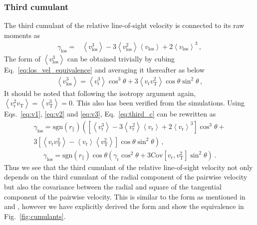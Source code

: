 \documentclass[a4paper,fleqn,usenatbib]{mnras}
\begin{document}
	\subsubsection{Third cumulant}
	\noindent The third cumulant of the relative line-of-sight velocity is connected to its raw moments as
	\begin{eqnarray}\label{eq:third_c}
		\gamma_{\mathrm{los}} = & \left\langle v^3_{\mathrm{los}} \right\rangle - 3 \left\langle v^2_{\mathrm{los}} \right\rangle \left\langle v_{\mathrm{los}}\right\rangle  + 2 \left\langle v_{\mathrm{los}}\right\rangle^3 \, ,
	\end{eqnarray}
	The form of $\left\langle v^3_{\mathrm{los}} \right\rangle$ can be obtained trivially by cubing Eq.~\ref{eq:los_vel_equivalence} and averaging it thereafter as below
	\begin{eqnarray}\label{eq:v3}
	\left\langle v^3_{\mathrm{los}} \right\rangle = \left\langle v^3_{\mathrm{r}}\right\rangle \cos^3\theta + 3 \left\langle  v_{\mathrm{r}}v^2_{\mathrm{T}}\right\rangle\cos\theta\sin^2\theta \, ,
	\end{eqnarray}	
	\noindent It should be noted that following the isotropy argument again, $\left\langle  v^2_{\mathrm{r}}v_{\mathrm{T}}\right\rangle = \left\langle v^3_{\mathrm{T}}\right\rangle = 0$. This also has been verified from the simulations. Using Eqs.~\ref{eq:v1}, \ref{eq:v2} and \ref{eq:v3}, Eq.~\ref{eq:third_c} can be rewritten as
	\begin{multline}
		\gamma_{\mathrm{los}} = \mathrm{sgn}(r_{\parallel}) \left(\left[\left\langle v^3_{\mathrm{r}} \right\rangle - 3 \left\langle v^2_{\mathrm{r}} \right\rangle \left\langle v_{\mathrm{r}}\right\rangle  + 2 \left\langle v_{\mathrm{r}}\right\rangle^3\right]\cos^3\theta + \right.\\
		\left. 3 \left[\left\langle  v_{\mathrm{r}}v^2_{\mathrm{T}}\right\rangle - \left\langle  v_{\mathrm{r}}\right\rangle \left\langle v^2_{\mathrm{T}}\right\rangle\right]\cos\theta\sin^2\theta\right) \, ,
	\end{multline}
	\begin{eqnarray}\label{eq:c3}
		\gamma_{\mathrm{los}} = \mathrm{sgn}(r_{\parallel}) \cos\theta \left(\gamma_{\mathrm{r}}\cos^2\theta  + 3 \mathrm{Cov}\left[v_{\mathrm{r}},v^2_{\mathrm{T}}\right]\sin^2\theta \right) \, .
	\end{eqnarray}
	\noindent Thus we see that the third cumulant of the relative line-of-sight velocity not only depends on the third cumulant of the radial component of the pairwise velocity but also the covariance between the radial and square of the tangential component of the pairwise velocity. This is similar to the form as mentioned in \citealt{uh15} and \citealt{bi2}, however we have explicitly derived the form and show the equivalence in Fig.~\ref{fig:cumulants}.
	
\end{document}
